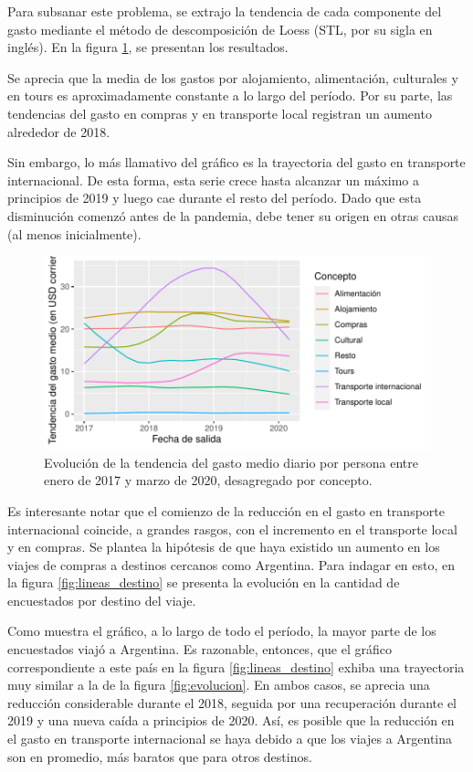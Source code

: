 \documentclass[
]{article}
\begin{document}
Para subsanar este problema, se extrajo la tendencia de cada componente
del gasto mediante el método de descomposición de Loess (STL, por su
sigla en inglés). En la figura \ref{fig:evolucion_desest}, se presentan
los resultados.

Se aprecia que la media de los gastos por alojamiento, alimentación,
culturales y en tours es aproximadamente constante a lo largo del
período. Por su parte, las tendencias del gasto en compras y en
transporte local registran un aumento alrededor de 2018.

Sin embargo, lo más llamativo del gráfico es la trayectoria del gasto en
transporte internacional. De esta forma, esta serie crece hasta alcanzar
un máximo a principios de 2019 y luego cae durante el resto del período.
Dado que esta disminución comenzó antes de la pandemia, debe tener su
origen en otras causas (al menos inicialmente).

\begin{figure}[H]

{\centering \includegraphics{Informe-Proyectofinal_files/figure-latex/evolucion_desest-1} 

}

\caption{Evolución de la tendencia del gasto medio diario por persona entre enero de 2017 y marzo de 2020, desagregado por concepto.}\label{fig:evolucion_desest}
\end{figure}

Es interesante notar que el comienzo de la reducción en el gasto en
transporte internacional coincide, a grandes rasgos, con el incremento
en el transporte local y en compras. Se plantea la hipótesis de que haya
existido un aumento en los viajes de compras a destinos cercanos como
Argentina. Para indagar en esto, en la figura \ref{fig:lineas_destino}
se presenta la evolución en la cantidad de encuestados por destino del
viaje.

Como muestra el gráfico, a lo largo de todo el período, la mayor parte
de los encuestados viajó a Argentina. Es razonable, entonces, que el
gráfico correspondiente a este país en la figura
\ref{fig:lineas_destino} exhiba una trayectoria muy similar a la de la
figura \ref{fig:evolucion}. En ambos casos, se aprecia una reducción
considerable durante el 2018, seguida por una recuperación durante el
2019 y una nueva caída a principios de 2020. Así, es posible que la
reducción en el gasto en transporte internacional se haya debido a que
los viajes a Argentina son en promedio, más baratos que para otros
destinos.
\end{document}
